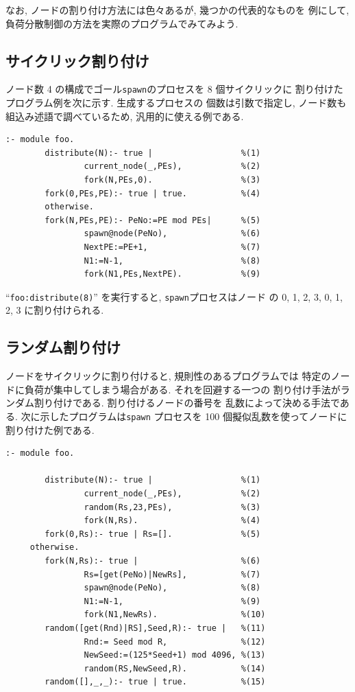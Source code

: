 \documentclass[a4,titlepage]{jsreport}
\begin{document}
なお, ノードの割り付け方法には色々あるが, 幾つかの代表的なものを
例にして, 負荷分散制御の方法を実際のプログラムでみてみよう.  

\subsection*{サイクリック割り付け}
ノード数 4 の構成でゴール{\tt spawn}のプロセスを 8 個サイクリックに
割り付けたプログラム例を次に示す.   生成するプロセスの
個数は引数で指定し, ノード数も組込み述語で調べているため, 
汎用的に使える例である.  

\begin{Verbatim}[baselinestretch=0.8]
:- module foo.
        distribute(N):- true |                  %(1)
                current_node(_,PEs),            %(2)
                fork(N,PEs,0).                  %(3)
        fork(0,PEs,PE):- true | true.           %(4)
        otherwise.
        fork(N,PEs,PE):- PeNo:=PE mod PEs|      %(5)
                spawn@node(PeNo),               %(6)
                NextPE:=PE+1,                   %(7)
                N1:=N-1,                        %(8)
                fork(N1,PEs,NextPE).            %(9)

\end{Verbatim} 

``\verb|foo:distribute(8)|'' を実行すると, {\tt spawn}プロセスはノード
の 0, 1, 2, 3, 0, 1, 2, 3 に割り付けられる.  

\subsection*{ランダム割り付け}

ノードをサイクリックに割り付けると, 規則性のあるプログラムでは
特定のノードに負荷が集中してしまう場合がある.  それを回避する一つの
割り付け手法がランダム割り付けである.  割り付けるノードの番号を
乱数によって決める手法である.  次に示したプログラムは{\tt spawn}
プロセスを 100 個擬似乱数を使ってノードに割り付けた例である.  

\begin{Verbatim}[baselinestretch=0.8]
:- module foo.

        distribute(N):- true |                  %(1)
                current_node(_,PEs),            %(2)
                random(Rs,23,PEs),              %(3)
                fork(N,Rs).                     %(4)
        fork(0,Rs):- true | Rs=[].              %(5)
     otherwise.
        fork(N,Rs):- true |                     %(6)
                Rs=[get(PeNo)|NewRs],           %(7)
                spawn@node(PeNo),               %(8)
                N1:=N-1,                        %(9)
                fork(N1,NewRs).                 %(10)
        random([get(Rnd)|RS],Seed,R):- true |   %(11)
                Rnd:= Seed mod R,               %(12)
                NewSeed:=(125*Seed+1) mod 4096, %(13)
                random(RS,NewSeed,R).           %(14)
        random([],_,_):- true | true.           %(15)

\end{Verbatim} 
\end{document}
